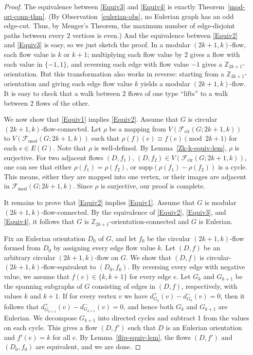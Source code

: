 \documentclass[a4paper,12pt]{article}
\theoremstyle{plain}
\theoremstyle{definition}
\newcommand{\Z}{\mathbb{Z}}
\begin{document}
\begin{proof}
The equivalence between \ref{Equiv3} and \ref{Equiv4} is exactly Theorem~\ref{mod-ori-conn-thm}. (By Observation~\ref{eulerian-obs},
no Eulerian graph has an odd edge-cut. Thus, by Menger's Theorem, the maximum number of edge-disjoint paths between every $2$ vertices is even.) And the equivalence between \ref{Equiv2} and \ref{Equiv3} is easy, so we just sketch the proof. In a modular $(2k+1,k)$-flow, each flow value is $k$ or $k+1$; multiplying each flow value by $2$ gives a flow with each value in $\{-1,1\}$, and reversing each edge with flow value $-1$ gives a $\Z_{2k+1}$-orientation. But this transformation also works in reverse: starting from a $\Z_{2k+1}$-orientation and giving each edge flow value $k$ yields a modular $(2k+1,k)$-flow. It is easy to check that a walk between 2 flows of one type ``lifts'' to a walk between 2 flows of the other.

We now show that \ref{Equiv1} implies \ref{Equiv2}. Assume that $G$ is circular $(2k+1,k)$-flow-connected. Let \(\rho\) be a mapping from \(V(\mathcal{F}_{\mathrm{cir}}(G;2k+1,k))\) to $V(\mathcal{F}_{\mathrm{mod}}(G;2k+1,k))$ such that \(\rho(f)(e)\equiv f(e)\pmod{2k+1}\) for each \(e\in E(G)\).
Note that \(\rho\) is well-defined. By Lemma~\ref{Zk-k-equiv-lem}, $\rho$ is surjective. 
For two adjacent flows $(D,f_1)$, $(D,f_2)\in V(\mathcal{F}_{\mathrm{cir}}(G;2k+1,k))$, one can see that either $\rho(f_1)=\rho(f_2)$, or $\text{supp}(\rho(f_1)-\rho(f_2))$ is a cycle. This means, either they are mapped into one vertex, or their images are adjacent in $\mathcal{F}_{\mathrm{mod}}(G;2k+1,k)$. Since \(\rho\) is surjective, our proof is complete. 

It remains to prove that \ref{Equiv2} implies \ref{Equiv1}. Assume that $G$ is modular $(2k+1,k)$-flow-connected. By the equivalence of \ref{Equiv2}, \ref{Equiv3}, and \ref{Equiv4}, it follows that $G$ is $\Z_{2k+1}$-orientation-connected and $G$ is Eulerian. 

Fix an Eulerian orientation $D_0$ of $G$, and let $f_0$ be the circular $(2k+1,k)$-flow formed from 
$D_0$ by assigning every edge flow value $k$. Let $(D,f)$ be an arbitrary circular $(2k+1,k)$-flow on $G$. We show that $(D,f)$ is circular-$(2k+1,k)$-flow-equivalent 
to $(D_0,f_0)$. By reversing every edge with negative value, we assume that $f(e)\in \{k,k+1\}$ for every edge $e$. Let $G_k$ and $G_{k+1}$ be the spanning subgraphs of $G$ consisting of edges in $(D,f)$, respectively, with values $k$ and $k+1$. If for every vertex $v$ we have $d_{G_k}^+(v)-d_{G_k}^-(v)=0$, then it follows that $d_{G_{k+1}}^+(v)-d_{G_{k+1}}^-(v)=0$, and hence both $G_k$ and $G_{k+1}$ are Eulerian. We decompose $G_{k+1}$ into directed cycles and subtract 1 from the values on each cycle. This gives a flow $(D,f')$ such that $D$ is an Eulerian orientation and $f'(e)=k$ for all $e$. By Lemma~\ref{flip-equiv-lem}, the flows $(D,f')$ and $(D_0,f_0)$ are equivalent, and we are done.


\end{proof}
\end{document}
